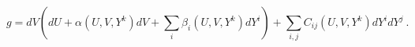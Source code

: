 \begin{equation}
 g = dV \left( dU + \alpha (U,V,Y^k) dV + \sum_i \beta_i(U,V,Y^k) d Y^i \right)
   + \sum_{i,j} C_{ij} (U,V,Y^k) dY^i dY^j ~.
\end{equation}

